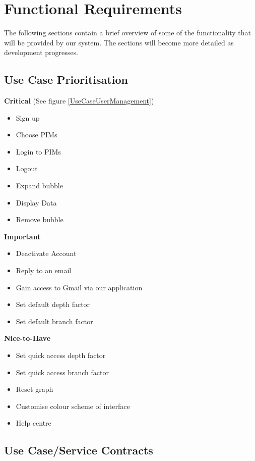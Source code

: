 \documentclass[hidelinks,english]{article}
\begin{document}
	\section{Functional Requirements}		
		The following sections contain a brief overview of some of the functionality that will be provided by our system. The sections will become more detailed as development progresses.
		\subsection{Use Case Prioritisation}
			\textbf{Critical} (See figure \ref{UseCaseUserManagement})
			\begin{itemize}
			    \item Sign up
			    \item Choose PIMs
			    \item Login to PIMs
			    \item Logout
			    \item Expand bubble
			   	\item Display Data
			    \item Remove bubble
			\end{itemize}
		    
		    \textbf{Important} 
			\begin{itemize}
			    \item Deactivate Account
			    \item Reply to an email
			    \item Gain access to Gmail via our application
			    \item Set default depth factor
			    \item Set default branch factor
			\end{itemize}
		    
			
			\textbf{Nice-to-Have}
			\begin{itemize}
			    \item Set quick access depth factor
			    \item Set quick access branch factor
				\item Reset graph
				\item Customise colour scheme of interface
			    \item Help centre
			\end{itemize}
			
		
		\subsection{Use Case/Service Contracts}
\end{document}
